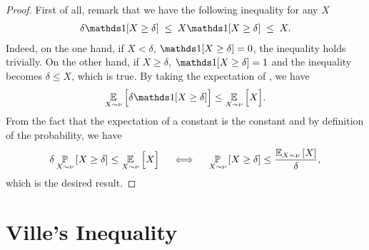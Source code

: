 \begin{noaddcontents}\begin{proof}
First of all, remark that we have the following inequality for any $X$
\begin{align}
    \delta\indic[X \ge \delta] \;\le\; X\indic[X \ge \delta] \;\le\; X.
    \label{ap:tools:eq:proof-general-markov}
\end{align}
Indeed, on the one hand, if $X<\delta$, $\indic[X \ge \delta]=0$, the inequality holds trivially.
On the other hand, if $X\ge\delta$, $\indic[X \ge \delta]=1$ and the inequality becomes $\delta\le X$, which is true.
By taking the expectation of , we have
\begin{align*}
    \EE_{X\sim\nu}\Big[\delta\indic[X \ge \delta]\Big] \le \EE_{X\sim\nu}\Big[ X\Big].
\end{align*}
From the fact that the expectation of a constant is the constant and by definition of the probability, we have
\begin{align*}
    \delta\operatorname*{\mathbb{P}}_{X\sim\nu}\left[ X \ge \delta\right] \le \operatorname*{\mathbb{E}}_{X\sim\nu}\Big[ X\Big] \quad\iff\quad \operatorname*{\mathbb{P}}_{X\sim\nu}\left[ X \ge \delta\right] \le \frac{\operatorname*{\mathbb{E}}_{X\sim\nu}\left[ X\right]}{\delta},
\end{align*}
which is the desired result.
\end{proof}\end{noaddcontents}

\section{Ville's Inequality}

